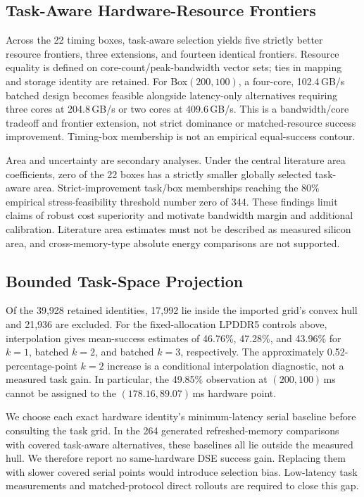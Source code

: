 \subsection{Task-Aware Hardware-Resource Frontiers}
Across the 22 timing boxes, task-aware selection yields five strictly better
resource frontiers, three extensions, and fourteen identical frontiers. Resource
equality is defined on core-count/peak-bandwidth vector sets; ties in mapping and
storage identity are retained. For Box$(200,100)$, a four-core, 102.4\,GB/s
batched design becomes feasible alongside latency-only alternatives requiring
three cores at 204.8\,GB/s or two cores at 409.6\,GB/s. This is a bandwidth/core
tradeoff and frontier extension, not strict dominance or matched-resource success
improvement. Timing-box membership is not an empirical equal-success contour.

Area and uncertainty are secondary analyses. Under the central literature area
coefficients, zero of the 22 boxes has a strictly smaller globally selected
task-aware area. Strict-improvement task/box memberships reaching the 80\%
empirical stress-feasibility threshold number zero of 344. These findings limit
claims of robust cost superiority and motivate bandwidth margin and additional
calibration. Literature area estimates must not be described as measured silicon
area, and cross-memory-type absolute energy comparisons are not supported.

\subsection{Bounded Task-Space Projection}
Of the 39,928 retained identities, 17,992 lie inside the imported grid's convex
hull and 21,936 are excluded. For the fixed-allocation LPDDR5 controls above,
interpolation gives mean-success estimates of 46.76\%, 47.28\%, and 43.96\%
for $k=1$, batched $k=2$, and batched $k=3$, respectively. The approximately
0.52-percentage-point $k=2$ increase is a conditional interpolation diagnostic,
not a measured task gain. In particular, the 49.85\% observation at
$(200,100)$\,ms cannot be assigned to the $(178.16,89.07)$\,ms hardware point.

We choose each exact hardware identity's minimum-latency serial baseline before
consulting the task grid. In the 264 generated refreshed-memory comparisons with
covered task-aware alternatives, these baselines all lie outside the measured
hull. We therefore report no same-hardware DSE success gain. Replacing them with
slower covered serial points would introduce selection bias. Low-latency task
measurements and matched-protocol direct rollouts are required to close this gap.

